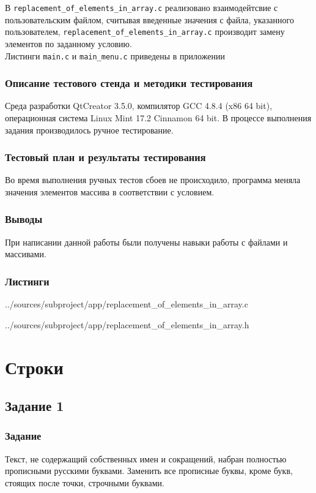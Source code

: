 \documentclass[12pt,a4paper]{report}
\begin{document}
В \verb+replacement_of_elements_in_array.c+  реализовано взаимодейтсвие с пользовательским файлом, считывая введенные значения с файла, указанного пользователем, \verb+replacement_of_elements_in_array.c+ производит замену элементов по заданному условию.\\

Листинги \verb+main.c+ и \verb+main_menu.c+ приведены в приложении
\subsection{Описание тестового стенда и методики тестирования}
Среда разработки QtCreator 3.5.0, компилятор GCC 4.8.4 (x86 64 bit), операционная система Linux Mint 17.2 Cinnamon 64 bit.
В процессе выполнения задания производилось ручное тестирование.
\subsection{Тестовый план и результаты тестирования}
Во время выполнения ручных тестов сбоев не происходило, программа меняла значения элементов массива в соответствии с условием.
\subsection{Выводы}
При написании данной работы были получены навыки работы с файлами и массивами.
\subsection*{Листинги}


{../sources/subproject/app/replacement_of_elements_in_array.c}


{../sources/subproject/app/replacement_of_elements_in_array.h}
\chapter{Строки}
\section{Задание 1}
\subsection{Задание}
Текст, не содержащий собственных имен и сокращений, набран полностью прописными русскими буквами. Заменить все прописные буквы, кроме букв, стоящих после точки, строчными буквами.
\end{document}
